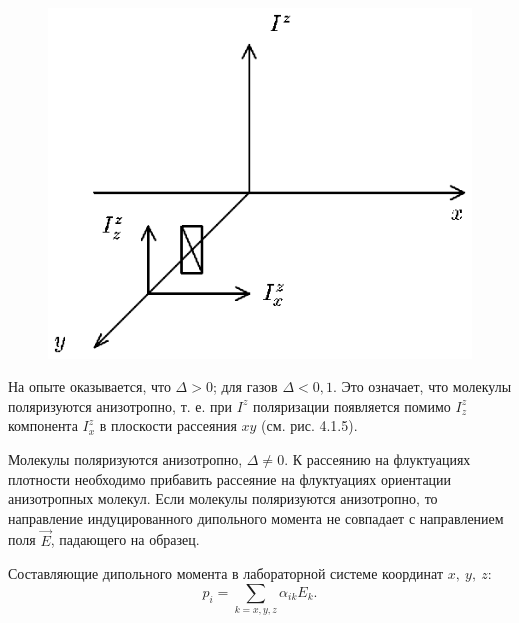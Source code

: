 \begin{figure}[tbp]
\centerline{\hbox{\includegraphics[scale=0.9]{Ris/ris_eps/ris4_1_05.eps}}}

\end{figure}


На опыте оказывается, что $\Delta>0$; для газов $\Delta<0,1$. Это
означает, что молекулы поляризуются анизотропно, т. е. при $I^z$
поляризации появляется помимо $I_{z}^z$ компонента $I_x^z$ в
плоскости рассеяния $xy$ (см. рис. 4.1.5).\par
{}
Молекулы поляризуются анизотропно, $\Delta\not=0$. К рассеянию на
флуктуациях плотности необходимо прибавить рассеяние на
флуктуациях ориентации анизотропных молекул. Если молекулы
поляризуются анизотропно, то направление индуцированного
дипольного момента не совпадает с направлением поля $\vec E$,
падающего на образец.

Составляющие дипольного момента в лабораторной системе координат
$x,\ y,\ z$:
$$p_i=\sum\limits_{k=x,y,z}\alpha_{ik}E_k.$$

